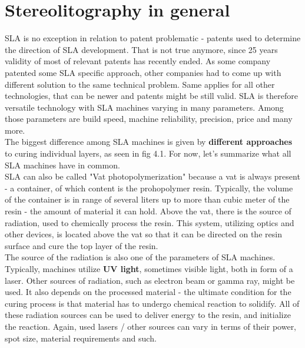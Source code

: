 \documentclass[a4paper, twoside, 11pt]{report}
\begin{document}
\section{Stereolitography in general}
SLA is no exception in relation to patent problematic - patents used to determine the direction of SLA development. That is not true anymore, since 25 years validity of most of relevant patents has recently ended. As some company patented some SLA specific approach, other companies had to come up with different solution to the same technical problem. Same applies for all other technologies, that can be newer and patents might be still valid. SLA is therefore versatile technology with SLA machines varying in many parameters. Among those parameters are build speed, machine reliability, precision, price and many more.\\
The biggest difference among SLA machines is given by \textbf{different approaches} to curing individual layers, as seen in fig 4.1. For now, let's summarize what all SLA machines have in common.
\\SLA can also be called "Vat photopolymerization" because a vat is always present - a container, of which content is the prohopolymer resin. Typically, the volume of the container is in range of several liters up to more than cubic meter of the resin - the amount of material it can hold. Above the vat, there is the source of radiation, used to chemically process the resin. This system, utilizing optics and other devices, is located above the vat so that it can be directed on the resin surface and cure the top layer of the resin.\\
The source of the radiation is also one of the parameters of SLA machines. Typically, machines utilize \textbf{UV light}, sometimes visible light, both in form of a laser. Other sources of radiation, such as electron beam or gamma ray, might be used. It also depends on the processed material - the ultimate condition for the curing process is that material has to undergo chemical reaction to solidify. All of these radiation sources can be used to deliver energy to the resin, and initialize the reaction. Again, used lasers / other sources can vary in terms of their power, spot size, material requirements and such.
\end{document}
